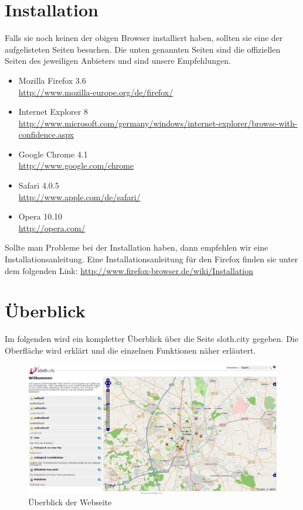\documentclass[a4paper,11pt]{scrartcl}
\begin{document}
\section{Installation}
Falls sie noch keinen der obigen Browser installiert haben, sollten sie eine der aufgelisteten Seiten besuchen. Die unten genannten Seiten sind die offiziellen Seiten des jeweiligen Anbieters und sind unsere Empfehlungen.
\begin{itemize}
	\item Mozilla Firefox 3.6 \\\url{http://www.mozilla-europe.org/de/firefox/}
	\item Internet Explorer 8 \\\url{http://www.microsoft.com/germany/windows/internet-explorer/browse-with-confidence.aspx}
	\item Google Chrome 4.1 \\\url{http://www.google.com/chrome}
	\item Safari 4.0.5 \\\url{http://www.apple.com/de/safari/}
	\item Opera 10.10 \\\url{http://opera.com/}
\end{itemize} 

Sollte man Probleme bei der Installation haben, dann empfehlen wir eine Installationsanleitung. Eine Installationsanleitung für den Firefox finden sie unter dem folgenden Link: \url{http://www.firefox-browser.de/wiki/Installation}

\section{Überblick}
Im folgenden wird ein kompletter Überblick über die Seite sloth.city gegeben. Die Oberfläche wird erklärt und die einzelnen Funktionen näher erläutert.

\begin{figure}[h]
\centering
\includegraphics[width = 15 cm]{img/ueberblick}
\caption{Überblick der Webseite}
\label{Überblick}
\end{figure}
\end{document}
